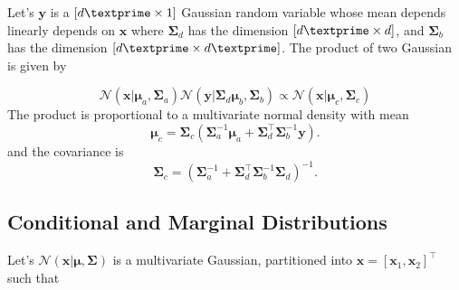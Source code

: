 Let's $\textbf{y}$ is a $\left[d\textprime \times 1 \right]$ Gaussian random variable whose mean depends linearly depends on  $\textbf{x}$ where $\boldsymbol{\Sigma}_d$ has the dimension $\left[d\textprime \times d \right]$, and $\boldsymbol{\Sigma}_b$ has the dimension $\left[d\textprime \times d\textprime \right]$. The product of two Gaussian is given by

\begin{equation}\label{eq:app_products_lin}
\mathcal{N}\left(\textbf{x}|\boldsymbol{\mu}_a,\boldsymbol{\Sigma}_a\right) \mathcal{N}\left(\textbf{y}|\boldsymbol{\Sigma}_d\boldsymbol{\mu}_b,\boldsymbol{\Sigma}_b\right) \propto
\mathcal{N}\left(\textbf{x}|\boldsymbol{\mu}_c,\boldsymbol{\Sigma}_c\right)
\end{equation}
The product is proportional to a multivariate normal density with mean 
\begin{equation}\label{eq:app_products_mean_lin}
\boldsymbol{\mu}_c = \boldsymbol{\Sigma}_c \left(\boldsymbol{\Sigma}_a^{-1}\boldsymbol{\mu}_a+\boldsymbol{\Sigma}_d^\top\boldsymbol{\Sigma}_b^{-1}\textbf{y}\right).
\end{equation}
and the covariance is
\begin{equation}\label{eq:app_products_cov_lin}
\boldsymbol{\Sigma}_c = \left(\boldsymbol{\Sigma}_a^{-1}+\boldsymbol{\Sigma}_d^\top\boldsymbol{\Sigma}_b^{-1}\boldsymbol{\Sigma}_d\right)^{-1}.
\end{equation} 


\subsection{Conditional and Marginal Distributions}

Let's $\mathcal{N}\left(\textbf{x}|\boldsymbol{\mu},\boldsymbol{\Sigma}\right)$ is a multivariate Gaussian, partitioned into $\textbf{x}=\left[\textbf{x}_1,\textbf{x}_2\right]^\top$ such that


